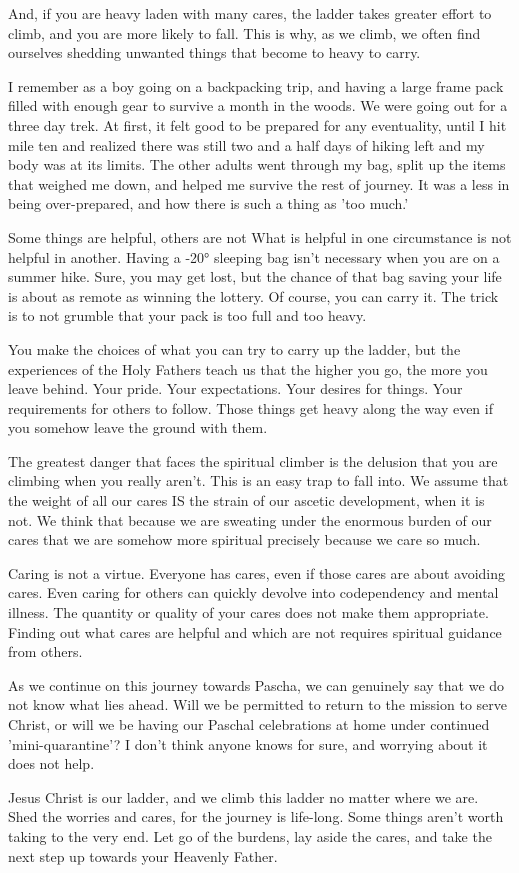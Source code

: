 \documentclass[twoside, letterpaper, 12pt]{report}
\begin{document}
\begin{maybetwocolumns}
And, if you are heavy laden with many cares, the ladder takes greater effort to climb,
and you are more likely to fall. This is why, as we climb,
we often find ourselves shedding unwanted things that become to heavy to carry.

I remember as a boy going on a backpacking trip,
and having a large frame pack filled with enough gear to survive a month in the woods.
We were going out for a three day trek.
At first, it felt good to be prepared for any eventuality,
until I hit mile ten and realized there was still two and a half days of hiking left
and my body was at its limits.
The other adults went through my bag, split up the items that weighed me down,
and helped me survive the rest of journey.
It was a less in being over-prepared, and how there is such a thing as 'too much.'

Some things are helpful, others are not
What is helpful in one circumstance is not helpful in another.
Having a -20° sleeping bag isn't necessary when you are on a summer hike.
Sure, you may get lost,
but the chance of that bag saving your life is about as remote as winning the lottery.
Of course, you can carry it.
The trick is to not grumble that your pack is too full and too heavy.

You make the choices of what you can try to carry up the ladder,
but the experiences of the Holy Fathers teach us that the higher you go, the more you leave behind.
Your pride. Your expectations. Your desires for things. Your requirements for others to follow.
Those things get heavy along the way even if you somehow leave the ground with them.

The greatest danger that faces the spiritual climber is the delusion that you are climbing when you
really aren't. This is an easy trap to fall into.
We assume that the weight of all our cares IS the strain of our ascetic development,
when it is not.
We think that because we are sweating under the enormous burden of our cares that we are somehow
more spiritual precisely because we care so much.

Caring is not a virtue. Everyone has cares, even if those cares are about avoiding cares.
Even caring for others can quickly devolve into codependency and mental illness.
The quantity or quality of your cares does not make them appropriate.
Finding out what cares are helpful and which are not requires spiritual guidance from others.

As we continue on this journey towards Pascha,
we can genuinely say that we do not know what lies ahead.
Will we be permitted to return to the mission to serve Christ,
or will we be having our Paschal celebrations at home under continued 'mini-quarantine'?
I don't think anyone knows for sure, and worrying about it does not help.

Jesus Christ is our ladder, and we climb this ladder no matter where we are.
Shed the worries and cares, for the journey is life-long.
Some things aren't worth taking to the very end.
Let go of the burdens, lay aside the cares,
and take the next step up towards your Heavenly Father.

\end{maybetwocolumns}
\end{document}
